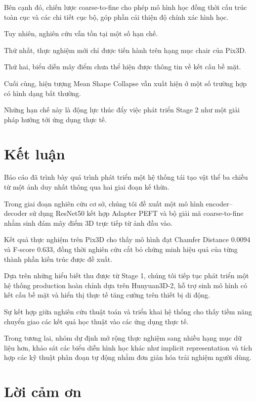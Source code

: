 \documentclass[conference,a4paper]{IEEEtran}
\begin{document}
Bên cạnh đó, chiến lược coarse-to-fine cho phép mô hình học đồng thời cấu trúc toàn cục và các chi tiết cục bộ, góp phần cải thiện độ chính xác hình học.

Tuy nhiên, nghiên cứu vẫn tồn tại một số hạn chế.

Thứ nhất, thực nghiệm mới chỉ được tiến hành trên hạng mục chair của Pix3D.

Thứ hai, biểu diễn mây điểm chưa thể hiện được thông tin về kết cấu bề mặt.

Cuối cùng, hiện tượng Mean Shape Collapse vẫn xuất hiện ở một số trường hợp có hình dạng bất thường.

Những hạn chế này là động lực thúc đẩy việc phát triển Stage 2 như một giải pháp hướng tới ứng dụng thực tế.

\section{Kết luận}

Báo cáo đã trình bày quá trình phát triển một hệ thống tái tạo vật thể ba chiều từ một ảnh duy nhất thông qua hai giai đoạn kế thừa.

Trong giai đoạn nghiên cứu cơ sở, chúng tôi đề xuất một mô hình encoder--decoder sử dụng ResNet50 kết hợp Adapter PEFT và bộ giải mã coarse-to-fine nhằm sinh đám mây điểm 3D trực tiếp từ ảnh đầu vào.

Kết quả thực nghiệm trên Pix3D cho thấy mô hình đạt Chamfer Distance 0.0094 và F-score 0.633, đồng thời nghiên cứu cắt bỏ chứng minh hiệu quả của từng thành phần kiến trúc được đề xuất.

Dựa trên những hiểu biết thu được từ Stage 1, chúng tôi tiếp tục phát triển một hệ thống production hoàn chỉnh dựa trên Hunyuan3D-2, hỗ trợ sinh mô hình có kết cấu bề mặt và hiển thị thực tế tăng cường trên thiết bị di động.

Sự kết hợp giữa nghiên cứu thuật toán và triển khai hệ thống cho thấy tiềm năng chuyển giao các kết quả học thuật vào các ứng dụng thực tế.

Trong tương lai, nhóm dự định mở rộng thực nghiệm sang nhiều hạng mục dữ liệu hơn, khảo sát các biểu diễn hình học khác như implicit representation và tích hợp các kỹ thuật phân đoạn tự động nhằm đơn giản hóa trải nghiệm người dùng.

\section*{Lời cảm ơn}
\end{document}
